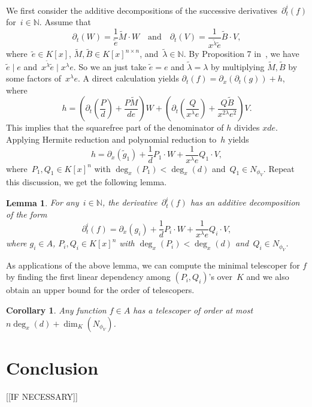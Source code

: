 \documentclass{sig-alternate}
\newtheorem{corollary}[theorem]{Corollary}
\newtheorem{lemma}[theorem]{Lemma}
\newcommand{\bN}{ {\mathbb N}}
\begin{document}
We first consider the additive decompositions of the successive derivatives~$\partial_t^i(f)$ for~$i\in \bN$.
Assume that
\[\partial_t(W) = \frac{1}{\tilde{e}} \tilde{M} \cdot W \quad \text{and}
\quad \partial_t(V) = \frac{1}{x^{\tilde{\lambda}} \tilde{e}} \tilde{B} \cdot V,\]
where~$\tilde e \in K[x]$, $\tilde M, \tilde B\in K[x]^{n\times n}$, and~$\tilde \lambda \in \bN$.
By Proposition 7 in~\cite{chen14a}, we have $\tilde e \mid e$ and~$x^{\tilde{\lambda}} \tilde{e} \mid x^\lambda e$.
So we an just take $\tilde e = e$ and $\tilde{\lambda}  = \lambda$ by multiplying $\tilde M, \tilde B$ by some factors
of~$x^\lambda e$. A direct calculation yields $\partial_t(f) = \partial_x(\partial_t(g))+ h$,
where
\[h = \left(\partial_t(\frac{P}{d})+\frac{P\tilde M}{de}\right)W + \left(\partial_t(\frac{Q}{x^\lambda e})+ \frac{Q\tilde B}{x^{2\lambda} e^2}\right)V.\]
This implies that the squarefree part of the denominator of $h$ divides $xde$. Applying Hermite reduction and polynomial reduction
to~$h$ yields
\[ h = \partial_x(\tilde g_1) + \frac{1}{d} P_1\cdot W + \frac{1}{x^\lambda e} Q_1\cdot V,\]
where~$P_1, Q_1\in K[x]^n$ with $\deg_x(P_1) < \deg_x(d)$ and~$Q_1\in N_{\phi_{V}}$.
Repeat this discussion, we get the following lemma.
\begin{lemma}\label{LEM:idtf}
For any~$i\in \bN$, the derivative~$\partial_t^i(f)$ has an additive decomposition of the form
\[ \partial_t^i(f) = \partial_x(g_i) + \frac{1}{d} P_i\cdot W + \frac{1}{x^\lambda e} Q_i\cdot V,\]
where $g_i\in A$, $P_i, Q_i\in K[x]^n$ with $\deg_x(P_i) < \deg_x(d)$ and~$Q_i\in N_{\phi_{V}}$.
\end{lemma}
As applications of the above lemma, we can compute the minimal telescoper for $f$ by finding the first
linear dependency among $(P_i, Q_i)$'s over~$K$ and we also obtain an upper bound for the order of telescopers.
\begin{corollary}
Any function $f\in A$ has a telescoper of order at most~$n\deg_x(d) + \dim_K(N_{\phi_V})$.
\end{corollary}

\section{Conclusion}

[[IF NECESSARY]]



\end{document}

